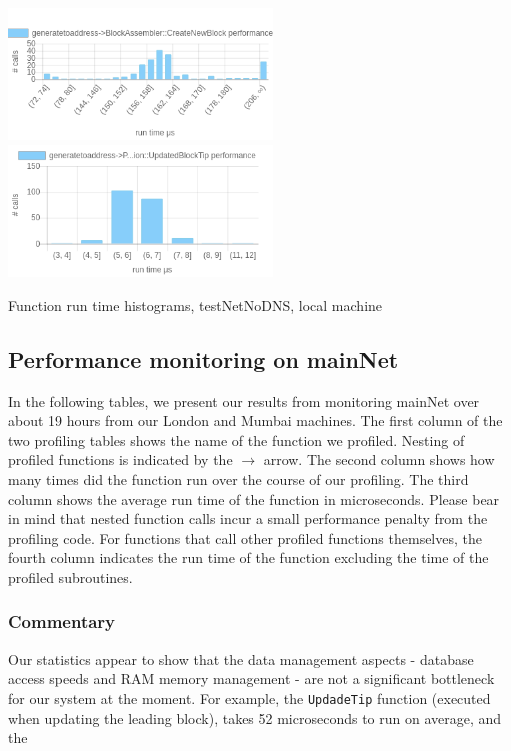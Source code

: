 \documentclass{article}
\begin{document}
\begin{table}
	\includegraphics[width=7cm]{images/local/chartgeneratetoaddress-_3EBlockAssembler_3A_3ACreateNewBlock.png}
	\includegraphics[width=7cm]{images/local/chartgeneratetoaddress-_3EPeerLogicValidation_3A_3AUpdatedBlockTip.png}
	
	
	\caption{Function run time histograms, testNetNoDNS, local machine}
\end{table}

\subsection{Performance monitoring on mainNet}
In the following tables, we present our results from monitoring mainNet over about 19 hours from our London and Mumbai machines. The first column of the two profiling tables shows the name of the function we profiled. Nesting of profiled functions is indicated by the $ \to $ arrow. The second column shows how many times did the function run over the course of our profiling. The third column shows the average run time of the function in microseconds. Please bear in mind that nested function calls incur a small performance penalty from the profiling code. For functions that call other profiled functions themselves, the fourth column indicates the run time of the function excluding the time of the profiled subroutines.


\subsubsection{Commentary}
Our statistics appear to show that the data management aspects - database access speeds and RAM memory management - are not a significant bottleneck for our system at the moment. For example, the \verb|UpdadeTip| function (executed when updating the leading block), takes 52 microseconds to run on average, and the 
\end{document}
